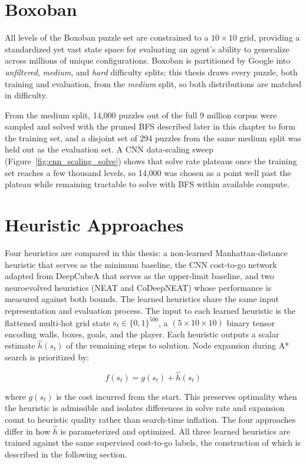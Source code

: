 \section{Boxoban}

All levels of the Boxoban puzzle set are constrained to a $10\times10$ grid, providing a standardized yet vast state space for evaluating an agent's ability to generalize across millions of unique configurations. Boxoban is partitioned by Google into \emph{unfiltered}, \emph{medium}, and \emph{hard} difficulty splits; this thesis draws every puzzle, both training and evaluation, from the \emph{medium} split, so both distributions are matched in difficulty.

From the medium split, 14{,}000 puzzles out of the full 9 million corpus were sampled and solved with the pruned BFS described later in this chapter to form the training set, and a disjoint set of 294 puzzles from the same medium split was held out as the evaluation set. A CNN data-scaling sweep (Figure~\ref{fig:cnn_scaling_solve}) shows that solve rate plateaus once the training set reaches a few thousand levels, so 14{,}000 was chosen as a point well past the plateau while remaining tractable to solve with BFS within available compute.

\section{Heuristic Approaches}

Four heuristics are compared in this thesis: a non-learned Manhattan-distance heuristic that serves as the minimum baseline, the CNN cost-to-go network adapted from DeepCubeA that serves as the upper-limit baseline, and two neuroevolved heuristics (NEAT and CoDeepNEAT) whose performance is measured against both bounds. The learned heuristics share the same input representation and evaluation process. The input to each learned heuristic is the flattened multi-hot grid state $s_t \in \{0,1\}^{500}$, a $(5 \times 10 \times 10)$ binary tensor encoding walls, boxes, goals, and the player. Each heuristic outputs a scalar estimate $\hat{h}(s_t)$ of the remaining steps to solution. Node expansion during A* search is prioritized by:

$$f(s_t) = g(s_t) + \hat{h}(s_t)$$

where $g(s_t)$ is the cost incurred from the start. This preserves optimality when the heuristic is admissible and isolates differences in solve rate and expansion count to heuristic quality rather than search-time inflation. The four approaches differ in how $\hat{h}$ is parameterized and optimized. All three learned heuristics are trained against the same supervised cost-to-go labels, the construction of which is described in the following section.

